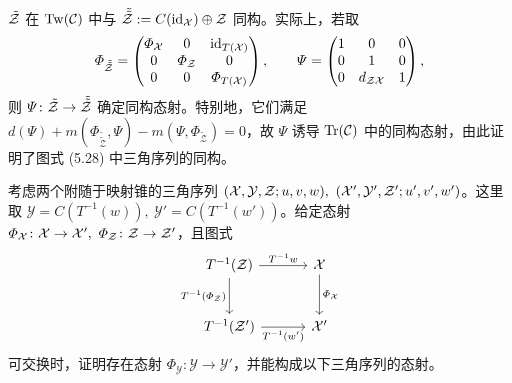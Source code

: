 $\tilde{\mathcal{Z}}$ 在 $\mathrm{Tw}(\mathcal{C})$ 中与 $\tilde{\tilde{\mathcal{Z}}} := C(\mathrm{id}_{\mathcal{X}})\oplus\mathcal{Z}$ 同构。实际上，若取
\[
  \varPhi_{\tilde{\tilde{\mathcal{Z}}}} =
  \begin{pmatrix}
    \varPhi_{\mathcal{X}} & 0 & \mathrm{id}_{T(\mathcal{X})}\\
    0 & \varPhi_{\mathcal{Z}} & 0\\
    0 & 0 & \varPhi_{T(\mathcal{X})}
  \end{pmatrix},
  \qquad
  \varPsi =
  \begin{pmatrix}
    1 & 0 & 0\\
    0 & 1 & 0\\
    0 & d_{\mathcal{Z}\mathcal{X}} & 1
  \end{pmatrix},
\]
则 $\varPsi \colon \tilde{\mathcal{Z}} \to \tilde{\tilde{\mathcal{Z}}}$ 确定同构态射。特别地，它们满足 $d(\varPsi) + m(\varPhi_{\tilde{\tilde{\mathcal{Z}}}},\varPsi) - m(\varPsi,\varPhi_{\tilde{\mathcal{Z}}}) = 0$，故 $\varPsi$ 诱导 $\operatorname{Tr}(\mathcal{C})$ 中的同构态射，由此证明了图式 (5.28) 中三角序列的同构。

 考虑两个附随于映射锥的三角序列 $(\cX,\mathcal{Y},\cZ;u,v,w),\ (\cX',\mathcal{Y}',\cZ';u',v',w')$。这里取 $\mathcal{Y} = C(T^{-1}(w)),\ \mathcal{Y}' = C(T^{-1}(w'))$。给定态射 $\varPhi_{\mathcal{X}} \colon \cX \to \cX',\ \varPhi_{\mathcal{Z}} \colon \cZ \to \cZ'$，且图式
\begin{equation*}
\begin{tikzcd}[row sep=2.6em, column sep=3.2em]
  T^{-1}(\mathcal{Z}) \arrow[r,"T^{-1}w"] \arrow[d,"T^{-1}(\varPhi_{\mathcal{Z}})"'] & \mathcal{X} \arrow[d,"\varPhi_{\mathcal{X}}"]\\
  T^{-1}(\mathcal{Z}') \arrow[r,"T^{-1}(w')"'] & \mathcal{X}'
\end{tikzcd}
\end{equation*}
可交换时，证明存在态射 $\varPhi_{\mathcal{Y}} \colon \mathcal{Y} \to \mathcal{Y}'$，并能构成以下三角序列的态射。


